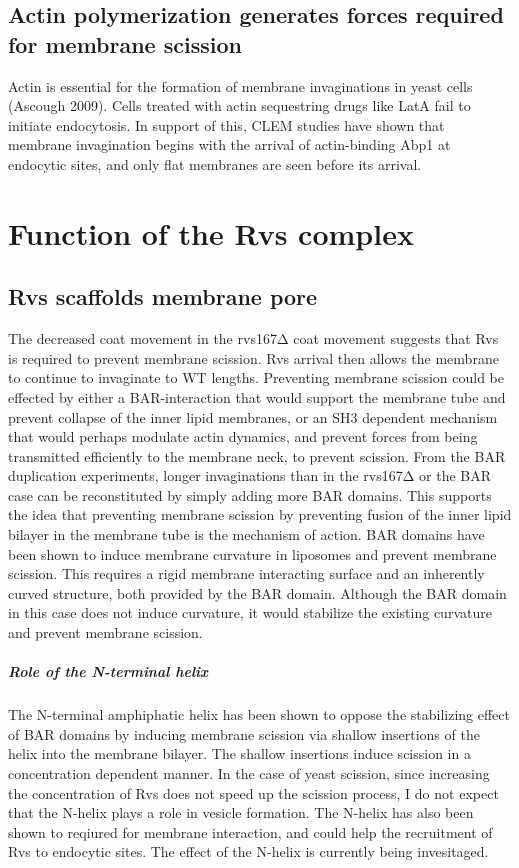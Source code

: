 \subsection{ Actin polymerization generates forces required for membrane scission}
Actin is essential for the formation of membrane invaginations in yeast cells (Ascough 2009). Cells treated with actin sequestring drugs like LatA fail to initiate endocytosis. In support of this, CLEM studies have shown that membrane invagination begins with the arrival of actin-binding Abp1 at endocytic sites, and only flat membranes are seen before its arrival. 

\section{Function of the Rvs complex}

\subsection{Rvs scaffolds membrane pore}
The decreased coat movement in the rvs167Δ coat movement suggests that Rvs is required to prevent membrane scission. Rvs arrival then allows the membrane to continue to invaginate to WT lengths. Preventing membrane scission could be effected by either a BAR-interaction that would support the membrane tube and prevent collapse of the inner lipid membranes, or an SH3 dependent mechanism that would perhaps modulate actin dynamics, and prevent forces from being transmitted efficiently to the membrane neck, to prevent scission. From the BAR duplication experiments, longer invaginations than in the rvs167Δ or the BAR case can be reconstituted by simply adding more BAR domains. This supports the idea that preventing membrane scission by preventing fusion of the inner lipid bilayer in the membrane tube is the mechanism of action. 
BAR domains have been shown to induce membrane curvature in liposomes and prevent membrane scission. This requires a rigid membrane interacting surface and an inherently curved structure, both provided by the BAR domain. Although the BAR domain in this case does not induce curvature, it would stabilize the existing curvature and prevent membrane scission. 
\subparagraph{Role of the N-terminal helix}
The N-terminal amphiphatic helix has been shown to oppose the stabilizing effect of BAR domains by inducing membrane scission via shallow insertions of the helix into the membrane bilayer. The shallow insertions induce scission in a concentration dependent manner. In the case of yeast scission, since increasing the concentration of Rvs does not speed up the scission process, I do not expect that the N-helix plays a role in vesicle formation. The N-helix has also been shown to reqiured for membrane interaction, and could help the recruitment of Rvs to endocytic sites. The effect of the N-helix is currently being invesitaged.

